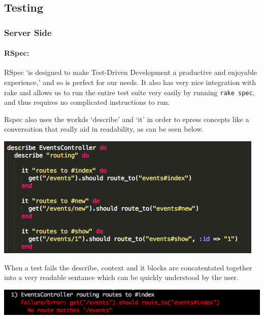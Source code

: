 \subsection{Testing}
  \subsubsection{Server Side}
    \paragraph{RSpec:}
      RSpec `is designed to make Test-Driven Development a productive and enjoyable experience,'\cite{rspec-overview} and so is perfect for our needs. It also has very nice integration with rake and allows us to run the entire test suite very easily by running \verb!rake spec!, and thus requires no complicated instructions to run.

      Rspec also uses the workds `describe' and `it' in order to epress concepts like a conversation that really aid in readability, as can be seen below.

      \begin{center}
      \includegraphics[scale=0.5]{images/project_management/testing/rspec_events_controller}
      \end{center}

      When a test fails the describe, context and it blocks are concatentated together into a very readable sentance which can be quickly understood by the user. 
      
      \begin{center}
      \includegraphics[scale=0.5]{images/project_management/testing/rspec_events_contoller_broken}
      \end{center}

